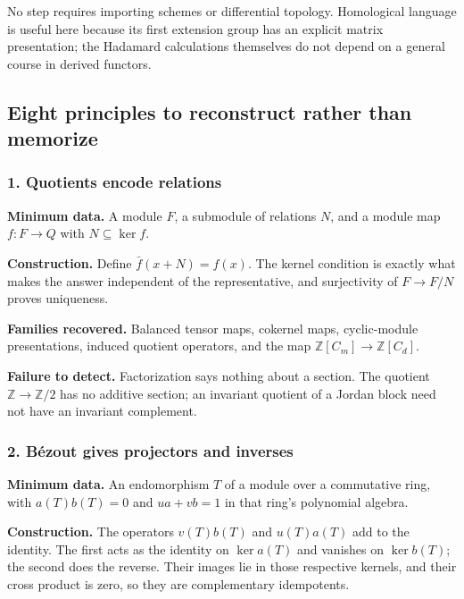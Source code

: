 \documentclass[
  11pt,
]{article}
\begin{document}
No step requires importing schemes or differential topology. Homological
language is useful here because its first extension group has an
explicit matrix presentation; the Hadamard calculations themselves do
not depend on a general course in derived functors.

\subsection*{Eight principles to reconstruct rather than
memorize}\label{eight-principles-to-reconstruct-rather-than-memorize}

\subsubsection*{1. Quotients encode
relations}\label{quotients-encode-relations}

\textbf{Minimum data.} A module \(F\), a submodule of relations \(N\),
and a module map \(f:F\to Q\) with \(N\subseteq\ker f\).

\textbf{Construction.} Define \(\bar f(x+N)=f(x)\). The kernel condition
is exactly what makes the answer independent of the representative, and
surjectivity of \(F\to F/N\) proves uniqueness.

\textbf{Families recovered.} Balanced tensor maps, cokernel maps,
cyclic-module presentations, induced quotient operators, and the map
\(\mathbb Z[C_m]\to\mathbb Z[C_d]\).

\textbf{Failure to detect.} Factorization says nothing about a section.
The quotient \(\mathbb Z\to\mathbb Z/2\) has no additive section; an
invariant quotient of a Jordan block need not have an invariant
complement.

\subsubsection*{2. Bézout gives projectors and
inverses}\label{buxe9zout-gives-projectors-and-inverses}

\textbf{Minimum data.} An endomorphism \(T\) of a module over a
commutative ring, with \(a(T)b(T)=0\) and \(ua+vb=1\) in that ring's
polynomial algebra.

\textbf{Construction.} The operators \(v(T)b(T)\) and \(u(T)a(T)\) add
to the identity. The first acts as the identity on \(\ker a(T)\) and
vanishes on \(\ker b(T)\); the second does the reverse. Their images lie
in those respective kernels, and their cross product is zero, so they
are complementary idempotents.
\end{document}
